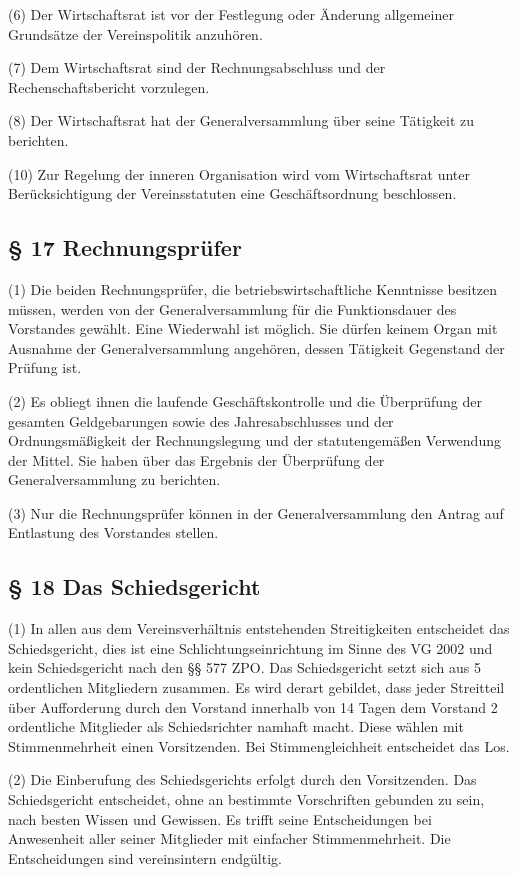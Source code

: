\documentclass[10pt,a4paper]{article}
\begin{document}
(6)
Der Wirtschaftsrat ist vor der Festlegung oder Änderung allgemeiner Grundsätze der Vereinspolitik anzuhören.

(7)
Dem Wirtschaftsrat sind der Rechnungsabschluss und der Rechenschaftsbericht vorzulegen.

(8)
Der Wirtschaftsrat hat der Generalversammlung über seine Tätigkeit zu berichten.

(10)
Zur Regelung der inneren Organisation wird vom Wirtschaftsrat unter Berücksichtigung der Vereinsstatuten eine Geschäftsordnung beschlossen.

\subsection{§ 17
Rechnungsprüfer}

(1)
Die beiden Rechnungsprüfer, die betriebswirtschaftliche Kenntnisse besitzen müssen, werden von der Generalversammlung für die Funktionsdauer des Vorstandes gewählt.
Eine Wiederwahl ist möglich.
Sie dürfen keinem Organ mit Ausnahme der Generalversammlung angehören, dessen Tätigkeit Gegenstand der Prüfung ist.

(2)
Es obliegt ihnen die laufende Geschäftskontrolle und die Überprüfung der gesamten Geldgebarungen sowie des Jahresabschlusses und der Ordnungsmäßigkeit der Rechnungslegung und der statutengemäßen Verwendung der Mittel.
Sie haben über das Ergebnis der Überprüfung der Generalversammlung zu berichten.

(3)
Nur die Rechnungsprüfer können in der Generalversammlung den Antrag auf Entlastung des Vorstandes stellen.

\subsection{§ 18
Das Schiedsgericht}

(1)
In allen aus dem Vereinsverhältnis entstehenden Streitigkeiten entscheidet das Schiedsgericht, dies ist eine Schlichtungseinrichtung im Sinne des VG 2002 und kein Schiedsgericht nach den §§ 577 ZPO.
Das Schiedsgericht setzt sich aus 5 ordentlichen Mitgliedern zusammen.
Es wird derart gebildet, dass jeder Streitteil über Aufforderung durch den Vorstand innerhalb von 14 Tagen dem Vorstand 2 ordentliche Mitglieder als Schiedsrichter namhaft macht.
Diese wählen mit Stimmenmehrheit einen Vorsitzenden.
Bei Stimmengleichheit entscheidet das Los.

(2)
Die Einberufung des Schiedsgerichts erfolgt durch den Vorsitzenden.
Das Schiedsgericht entscheidet, ohne an bestimmte Vorschriften gebunden zu sein, nach besten Wissen und Gewissen.
Es trifft seine Entscheidungen bei Anwesenheit aller seiner Mitglieder mit einfacher Stimmenmehrheit.
Die Entscheidungen sind vereinsintern endgültig.
\end{document}
